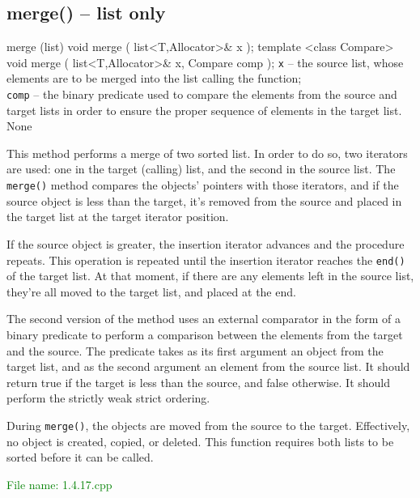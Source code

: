 
\subsection{merge() – list only} %
\begin{methodinfo}
  {merge (list)}
  {void merge ( list<T,Allocator>& x ); 
  template <class Compare> 
    void merge ( list<T,Allocator>& x, Compare comp );}
  {\texttt{x} – the source list, whose elements are to be merged into the list calling the function;\\
  \texttt{comp} – the binary predicate used to compare the elements from the source and target lists in order 
  to ensure the proper sequence of elements in the target list.}
  {None}
  {This method performs a merge of two sorted list. In order to do so, two iterators are used: 
  one in the target (calling) list, and the second in the source list. The \texttt{merge()} method 
  compares the objects’ pointers with those iterators, and if the source object is less than the 
  target, it’s removed from the source and placed in the target list at the target iterator position.

  If the source object is greater, the insertion iterator advances and the procedure repeats. 
  This operation is repeated until the insertion iterator reaches the \texttt{end()} of the target list. 
  At that moment, if there are any elements left in the source list, they’re all moved to the target list, 
  and placed at the end.

  The second version of the method uses an external comparator in the form of a binary predicate 
  to perform a comparison between the elements from the target and the source. The predicate takes 
  as its first argument an object from the target list, and as the second argument an element from 
  the source list. It should return true if the target is less than the source, and false otherwise. 
  It should perform the strictly weak strict  ordering.

  During \texttt{merge()}, the objects are moved from the source to the target. Effectively, no object is created, 
  copied, or deleted. This function requires both lists to be sorted before it can be called.}
\end{methodinfo}

\textcolor{green}{File name: 1.4.17.cpp}

